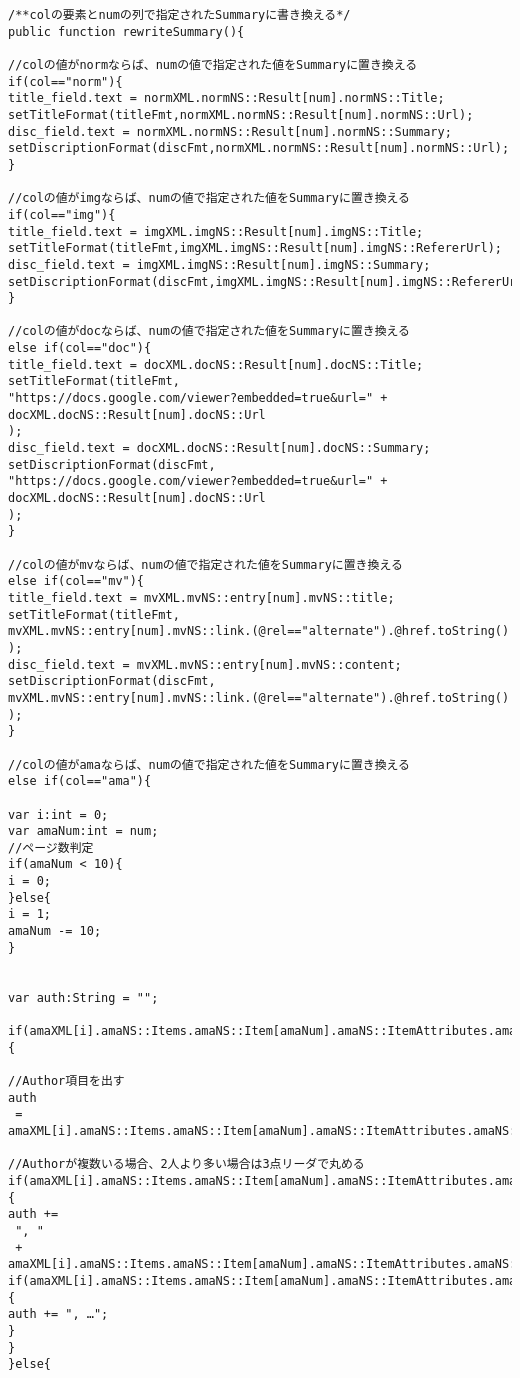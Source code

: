 {\begin{verbatim}
/**colの要素とnumの列で指定されたSummaryに書き換える*/
public function rewriteSummary(){

//colの値がnormならば、numの値で指定された値をSummaryに置き換える
if(col=="norm"){
title_field.text = normXML.normNS::Result[num].normNS::Title;
setTitleFormat(titleFmt,normXML.normNS::Result[num].normNS::Url);
disc_field.text = normXML.normNS::Result[num].normNS::Summary;
setDiscriptionFormat(discFmt,normXML.normNS::Result[num].normNS::Url);
}

//colの値がimgならば、numの値で指定された値をSummaryに置き換える
if(col=="img"){
title_field.text = imgXML.imgNS::Result[num].imgNS::Title;
setTitleFormat(titleFmt,imgXML.imgNS::Result[num].imgNS::RefererUrl);
disc_field.text = imgXML.imgNS::Result[num].imgNS::Summary;
setDiscriptionFormat(discFmt,imgXML.imgNS::Result[num].imgNS::RefererUrl);
}

//colの値がdocならば、numの値で指定された値をSummaryに置き換える
else if(col=="doc"){
title_field.text = docXML.docNS::Result[num].docNS::Title;
setTitleFormat(titleFmt,
"https://docs.google.com/viewer?embedded=true&url=" + docXML.docNS::Result[num].docNS::Url 
);
disc_field.text = docXML.docNS::Result[num].docNS::Summary;
setDiscriptionFormat(discFmt,
"https://docs.google.com/viewer?embedded=true&url=" + docXML.docNS::Result[num].docNS::Url 
);
}

//colの値がmvならば、numの値で指定された値をSummaryに置き換える
else if(col=="mv"){
title_field.text = mvXML.mvNS::entry[num].mvNS::title;
setTitleFormat(titleFmt,
mvXML.mvNS::entry[num].mvNS::link.(@rel=="alternate").@href.toString()
);
disc_field.text = mvXML.mvNS::entry[num].mvNS::content;
setDiscriptionFormat(discFmt,
mvXML.mvNS::entry[num].mvNS::link.(@rel=="alternate").@href.toString()
);
}

//colの値がamaならば、numの値で指定された値をSummaryに置き換える
else if(col=="ama"){

var i:int = 0;
var amaNum:int = num;
//ページ数判定
if(amaNum < 10){
i = 0;
}else{
i = 1;
amaNum -= 10;
}


var auth:String = "";

if(amaXML[i].amaNS::Items.amaNS::Item[amaNum].amaNS::ItemAttributes.amaNS::Author[0]!=null){

//Author項目を出す
auth
 = amaXML[i].amaNS::Items.amaNS::Item[amaNum].amaNS::ItemAttributes.amaNS::Author[0].toString();

//Authorが複数いる場合、2人より多い場合は3点リーダで丸める
if(amaXML[i].amaNS::Items.amaNS::Item[amaNum].amaNS::ItemAttributes.amaNS::Author[1]!=null){
auth +=
 ", "
 + amaXML[i].amaNS::Items.amaNS::Item[amaNum].amaNS::ItemAttributes.amaNS::Author[1].toString();
if(amaXML[i].amaNS::Items.amaNS::Item[amaNum].amaNS::ItemAttributes.amaNS::Author[1]!=null){
auth += ", …";
}
}
}else{


\end{verbatim}}
